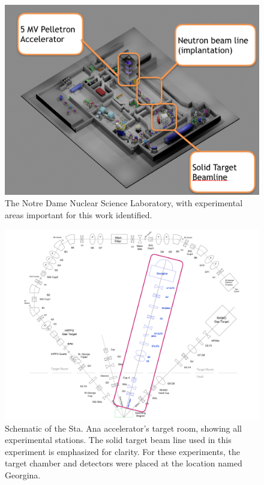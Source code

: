 \begin{figure}
\includegraphics[width=\linewidth]{figures/nslLab.png}
\caption{The Notre Dame Nuclear Science Laboratory, with experimental areas important for this work identified. }
\label{fig: nsl}
\end{figure}

\begin{figure}
\includegraphics[width=\linewidth]{figures/targetRoom.pdf}
\caption{Schematic of the Sta. Ana accelerator's target room, showing all experimental stations. The solid target beam line used in this experiment is emphasized for clarity. For these experiments, the target chamber and detectors were placed at the location named Georgina. } 
\label{fig: targetRoom}
\end{figure}





